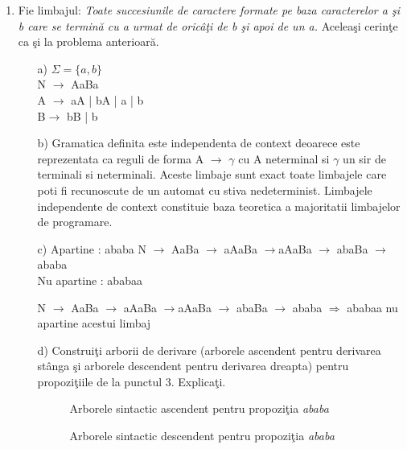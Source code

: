 \begin{enumerate}
\begin{enumerate}
\end{enumerate}

\item
Fie limbajul: \textit{Toate succesiunile de caractere formate pe baza caracterelor a şi b care se termină cu a urmat de oricâţi de b şi apoi de un a.} Aceleaşi cerinţe ca şi la problema anterioară.

\begin{enumerate}
\item[a)]
$\Sigma=\{a,b\}$\\
N $\rightarrow$ AaBa\\
A $\rightarrow$ aA | bA | a | b \\
B$\rightarrow$ bB | b\\

\item[b)]
Gramatica definita este independenta de context deoarece este reprezentata ca reguli de forma A $\rightarrow$ $\gamma$ cu A neterminal si $\gamma$ un sir de terminali si neterminali. Aceste limbaje sunt exact toate limbajele care poti fi recunoscute de un automat cu stiva nedeterminist. Limbajele independente de context constituie baza teoretica a majoritatii limbajelor de programare.

\item[c)]
Apartine :  ababa
N $\rightarrow$ AaBa $\rightarrow$ aAaBa $\rightarrow$aAaBa $\rightarrow$ abaBa $\rightarrow$ ababa\\

Nu apartine : ababaa

N $\rightarrow$ AaBa $\rightarrow$ aAaBa $\rightarrow$aAaBa $\rightarrow$ abaBa $\rightarrow$ ababa $\Rightarrow$  ababaa nu apartine acestui limbaj

\item[d)]
Construiţi arborii de derivare (arborele ascendent pentru derivarea stânga şi arborele descendent pentru derivarea dreapta) pentru propoziţiile de la punctul 3. Explicaţi.

\begin{figure}
\centering
{}
\caption{Arborele sintactic ascendent pentru propoziţia \textit{ababa}}

\centering
{}
\caption{Arborele sintactic descendent pentru propoziţia \textit{ababa}}
\end{figure}
\end{enumerate}


\end{enumerate}
